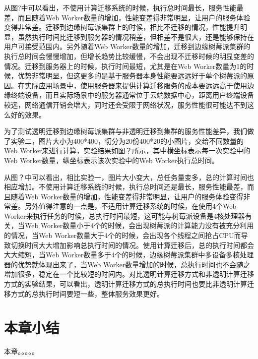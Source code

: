从图?中可以看出，不使用计算迁移系统的时候，执行总时间最长，服务性能最差，而且随着Web Worker数量的增加，性能变差得非常明显，让用户的服务体验变得非常差。迁移到边缘树莓派集群上的时候，相比不迁移的情况，性能提升明显，虽然执行时间比迁移到服务器的情况稍差，但相差不是很大，还是能够保持在用户可接受范围内。另外随着Web Worker数量的增加，迁移到边缘树莓派集群的执行总时间会慢慢增加，但增长趋势比较缓慢，不会出现不迁移时候的明显变差的情况。迁移到服务器上的时候，执行时间最短，尤其是在Web Worker数量为1的时候，优势非常明显，但这更多的是基于服务器本身性能要远远好于单个树莓派的原因。在实际应用场景中，使用服务器来提供计算迁移服务的成本要远远高于使用边缘终端设备，而且实际场景中的服务器通常位于云端数据中心，距离用户终端设备较远，网络通信开销会增大，同时还会受限于网络状况，服务性能很可能达不到这么好的效果。

为了测试透明迁移到边缘树莓派集群与非透明迁移到集群的服务性能差异，我们做了实验二，图片大小为400*400，切分为20份400*20的小图片，交给不同数量的Web Worker来进行计算，实验结果如图？所示，其中横坐标表示每一次实验中的Web Worker数量，纵坐标表示该次实验中的Web Worker执行总时间。

从图？中可以看出，相比实验一，图片大小变大，总任务量变多，总的计算时间也相应增加。不使用计算迁移系统的时候，执行总时间还是最长，服务性能最差，而且随着Web Worker数量的增加，性能变差得非常明显，让用户的服务体验变得非常差。另外值得注意的一点是，不适用计算迁移系统的时候，在使用4个Web Worker来执行任务的时候，总执行时间最短，这可能与树莓派设备是4核处理器有关，当Web Worker数量小于4个的时候，会出现树莓派的计算能力没有被充分利用的情况，当Web Worker数量大于4个的时候，会出现各个线程之间抢占CPU而导致切换时间大大增加影响总执行时间的情况。使用计算迁移后，总的执行时间都会大大缩短，当Web Worker数量多于4个的时候，边缘树莓派集群中多设备多核处理器的优势就体现出来了，当Web Worker数量增加的时候，总执行时间也不会随之增加很多，稳定在一个比较短的时间内。对比透明计算迁移方式和非透明计算迁移方式的实验结果，可以看出，透明计算迁移方式的总执行时间也要比非透明计算迁移方式的总执行时间要短一些，整体服务效果更好。

\section{本章小结}
本章。。。。。